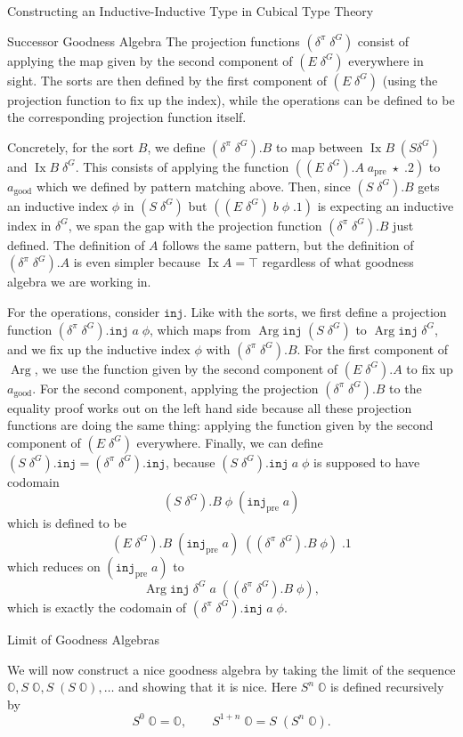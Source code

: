 \documentclass[runningheads]{llncs}
\DeclareMathOperator{\Arg}{Arg}
\DeclareMathOperator{\Ix}{Ix}
\newcommand{\pre}[1]{{#1}_\text{pre}}
\newcommand{\good}[1]{{#1}_\text{good}}
\newcommand{\bbO}{\mathbb{O}}
\newcommand{\inj}{\texttt{inj}}
\begin{document}
\begin{section}{Constructing an Inductive-Inductive Type in Cubical Type Theory}
\begin{subsection}{Successor Goodness Algebra}
The projection functions $(\delta^\pi\;\delta^G)$ consist of applying the map given by the second component of $(E\;\delta^G)$ everywhere in sight. The sorts are then defined by the first component of $(E\;\delta^G)$ (using the projection function to fix up the index), while the operations can be defined to be the corresponding projection function itself.

Concretely, for the sort $B$, we define $(\delta^\pi\;\delta^G).B$ to map between $\Ix B\; (S \delta^G)$ and $\Ix B\;\delta^G$. This consists of applying the function $((E\;\delta^G).A\;\pre{a}\;\star\;.2)$ to $\good{a}$ which we defined by pattern matching above. Then, since $(S\;\delta^G).B$ gets an inductive index $\phi$ in $(S\;\delta^G)$ but $((E\;\delta^G)\;b\;\phi\;.1)$ is expecting an inductive index in $\delta^G$, we span the gap with the projection function $(\delta^\pi\;\delta^G).B$ just defined. The definition of $A$ follows the same pattern, but the definition of $(\delta^\pi\;\delta^G).A$ is even simpler because $\Ix A = \top$ regardless of what goodness algebra we are working in.

For the operations, consider $\inj$. Like with the sorts, we first define a projection function $(\delta^\pi\;\delta^G).\inj\;a\;\phi$, which maps from $\Arg\inj\;(S\;\delta^G)$ to $\Arg\inj\;\delta^G$, and we fix up the inductive index $\phi$ with $(\delta^\pi\;\delta^G).B$. For the first component of $\Arg$, we use the function given by the second component of $(E\;\delta^G).A$ to fix up $\good{a}$. For the second component, applying the projection $(\delta^\pi\;\delta^G).B$ to the equality proof works out on the left hand side because all these projection functions are doing the same thing: applying the function given by the second component of $(E\;\delta^G)$ everywhere. Finally, we can define $(S\;\delta^G).\inj = (\delta^\pi\;\delta^G).\inj$, because $(S\;\delta^G).\inj\;a\;\phi$ is supposed to have codomain \[(S\;\delta^G).B\;\phi\;(\pre{\inj}\;a)\] which is defined to be \[(E\;\delta^G).B\;(\pre{\inj}\;a)\;((\delta^\pi\;\delta^G).B\;\phi)\;.1\] which reduces on $(\pre{\inj}\;a)$ to \[\Arg\inj\;\delta^G\;a\;((\delta^\pi\;\delta^G).B\;\phi),\] which is exactly the codomain of $(\delta^\pi\;\delta^G).\inj\;a\;\phi$.

\end{subsection}

\begin{subsection}{Limit of Goodness Algebras}\label{ex-limit-alg}

We will now construct a nice goodness algebra by taking the limit of the sequence $\bbO, S\;\bbO, S\;(S\;\bbO), \dots$ and showing that it is nice. Here $S^n\;\bbO$ is defined recursively by \[S^0\;\bbO = \bbO,\qquad S^{1+n}\;\bbO = S\;(S^n\;\bbO).\]


\end{subsection}
\end{section}
\end{document}
